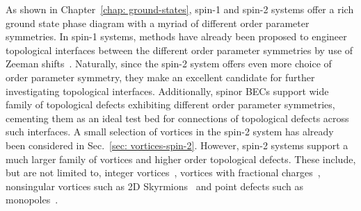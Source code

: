 As shown in Chapter~\ref{chap: ground-states}, spin-1 and spin-2 systems offer a
rich ground state phase diagram with a myriad of different order parameter
symmetries.
In spin-1 systems, methods have already been proposed to engineer topological
interfaces between the different order parameter symmetries by use of Zeeman
shifts~\cite{Borgh2012, Borgh2013, Borgh2014}.
Naturally, since the spin-2 system offers even more choice of order parameter
symmetry, they make an excellent candidate for further investigating topological
interfaces.
Additionally, spinor BECs support wide family of topological defects exhibiting
different order parameter symmetries, cementing them as an ideal test bed
for connections of topological defects across such interfaces.
A small selection of vortices in the spin-2 system has already been considered
in Sec.~\ref{sec: vortices-spin-2}.
However, spin-2 systems support a much larger family of vortices and higher
order topological defects. 
These include, but are not limited to, integer vortices~\cite{Yip1999,
Isoshima2002,Mizushima2002,Sadler2006,Semenoff2007,Lovegrove2012,
Lovegrove2016,Borgh2016,Weiss2019,Xiao2021,Xiao2022}, vortices with fractional
charges~\cite{Leonhardt2000,Zhou2003,Ji2008,Seo2015,Semenoff2007,Kobayashi2009,
Lovegrove2012,Lovegrove2016,Borgh2016,Borgh2017,Xiao2021,Xiao2022}, nonsingular
vortices such as 2D Skyrmions~\cite{Ohmi1998, Ho1998, Mizushima2002a,
Martikainen2002, Leanhardt2003, Mizushima2004, Choi2012, Choi2012a,
Lovegrove2014,Weiss2019} and point defects such as monopoles~\cite{Stoof2001,
Savage2003,Ruostekoski2003,Pietila2009,Ray2014,Ray2015,Ollikainen2017,
Mithun2022,Blinova2023}.

